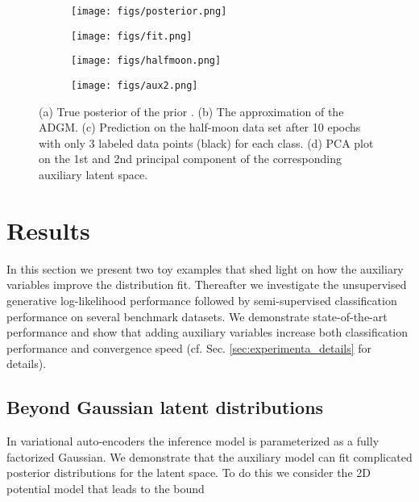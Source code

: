 \documentclass{article}
\begin{document}
\begin{figure*}
\centering
	\begin{subfigure}{.22\textwidth}
	  \centering
      \vspace{5mm}
      \texttt{[image: figs/posterior.png]}
      \vspace{8mm}
      \caption{ }
      \label{fig:posterior}
	\end{subfigure}
    \begin{subfigure}{.22\textwidth}
	  \centering
      \vspace{5mm}
      \texttt{[image: figs/fit.png]}
      \vspace{8mm}
      \caption{ }
      \label{fig:fit}
	\end{subfigure}
    \begin{subfigure}{.22\textwidth}
	  \centering
      \texttt{[image: figs/halfmoon.png]}
      \vspace{-5mm}
      \caption{ }
	  \label{fig:halfmoon}
	\end{subfigure}
    \begin{subfigure}{.22\textwidth}
	  \centering
      \texttt{[image: figs/aux2.png]}
	  \caption{ }
      \label{fig:aux}      
	\end{subfigure}
    \vspace{-3mm}
	\caption{(a) True posterior of the prior . (b) The approximation  of the ADGM. (c) Prediction on the half-moon data set after 10 epochs with only 3 labeled data points (black) for each class. (d) PCA plot on the 1st and 2nd principal component of the corresponding auxiliary latent space.}
\vspace{-2mm}
\end{figure*}

\section{Results} 
In this section we present two toy examples that shed light on how the auxiliary variables improve the distribution fit. Thereafter we investigate the unsupervised generative log-likelihood performance followed by semi-supervised classification performance on several benchmark datasets. We demonstrate state-of-the-art performance and show that adding auxiliary variables increase both classification performance and convergence speed (cf. Sec. \ref{sec:experimenta_details} for details).

\subsection{Beyond Gaussian latent distributions}\label{sec:vae_toy}In variational auto-encoders the inference model  is parameterized as a fully factorized Gaussian. We demonstrate that the auxiliary model can fit complicated posterior distributions for the latent space. To do this we consider the 2D potential model  \citep{Rezende2015} that leads to the bound
\end{document}
